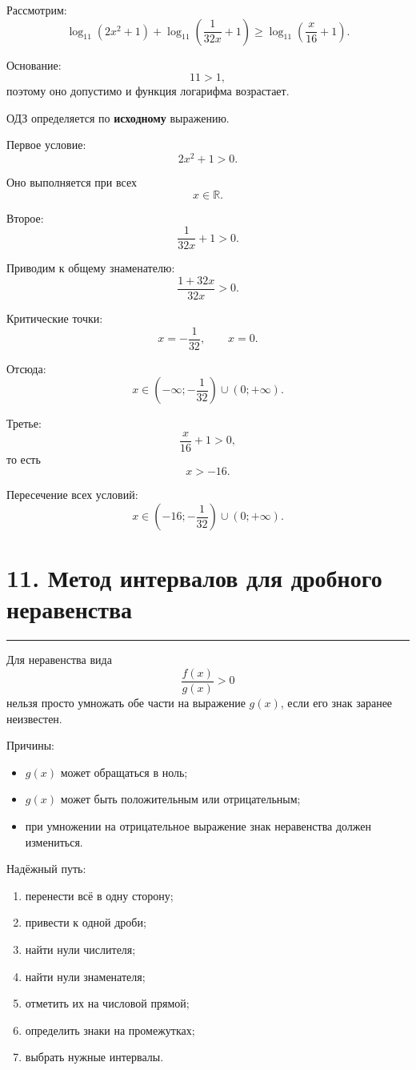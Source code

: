 \documentclass[a4paper,12pt]{article}
\newcommand{\sectionline}{%
    \vspace{0.2em}
    \noindent\color{linegray}\rule{\linewidth}{0.6pt}
    \vspace{0.4em}
}
\begin{document}
Рассмотрим:
\[
\log_{11}(2x^2+1)
+
\log_{11}\left(\frac1{32x}+1\right)
\ge
\log_{11}\left(\frac{x}{16}+1\right).
\]

Основание:
\[
11>1,
\]
поэтому оно допустимо и функция логарифма возрастает.

ОДЗ определяется по \textbf{исходному} выражению.

Первое условие:
\[
2x^2+1>0.
\]

Оно выполняется при всех
\[
x\in\mathbb R.
\]

Второе:
\[
\frac1{32x}+1>0.
\]

Приводим к общему знаменателю:
\[
\frac{1+32x}{32x}>0.
\]

Критические точки:
\[
x=-\frac1{32},
\qquad
x=0.
\]

Отсюда:
\[
x\in
\left(-\infty;-\frac1{32}\right)
\cup
(0;+\infty).
\]

Третье:
\[
\frac{x}{16}+1>0,
\]
то есть
\[
x>-16.
\]

Пересечение всех условий:
\[
\boxed{
x\in
\left(-16;-\frac1{32}\right)
\cup
(0;+\infty)
}.
\]

\section*{\color{darkaccent}11. Метод интервалов для дробного неравенства}
\sectionline

Для неравенства вида
\[
\frac{f(x)}{g(x)}>0
\]
нельзя просто умножать обе части на выражение \(g(x)\), если его знак заранее неизвестен.

Причины:

\begin{itemize}
    \item \(g(x)\) может обращаться в ноль;
    \item \(g(x)\) может быть положительным или отрицательным;
    \item при умножении на отрицательное выражение знак неравенства должен измениться.
\end{itemize}

Надёжный путь:

\begin{enumerate}
    \item перенести всё в одну сторону;
    \item привести к одной дроби;
    \item найти нули числителя;
    \item найти нули знаменателя;
    \item отметить их на числовой прямой;
    \item определить знаки на промежутках;
    \item выбрать нужные интервалы.
\end{enumerate}
\end{document}
